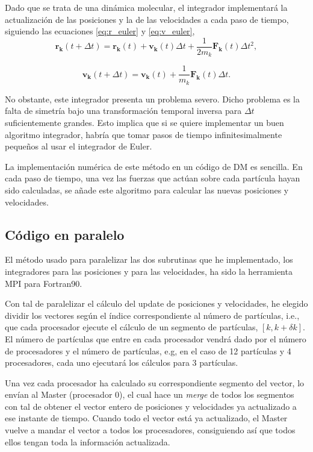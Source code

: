 \documentclass[onecolumn]{article}
\renewcommand{\vec}[1]{\mathbf{#1}}
\begin{document}
Dado que se trata de una dinámica molecular, el integrador implementará la actualización de las posiciones y la de las velocidades
a cada paso de tiempo, siguiendo las ecuaciones \eqref{eq:r_euler} y \eqref{eq:v_euler},
\begin{equation}\label{eq:r_euler} 
\vec{r_k}(t+\Delta t) = \vec{r_k}(t) + \vec{v_k}(t)\Delta t + \frac{1}{2m_k}\vec{F_k}(t)\Delta t^2 ,
\end{equation}

\begin{equation}\label{eq:v_euler} 
\vec{v_k}(t+\Delta t) = \vec{v_k}(t) + \frac{1}{m_k}\vec{F_k}(t)\Delta t .
\end{equation}

No obstante, este integrador presenta un problema severo. Dicho problema es la falta de simetría bajo una transformación temporal inversa para $\Delta t$ 
suficientemente grandes. Esto implica que si se quiere implementar un buen algoritmo integrador, habría que tomar pasos de tiempo infinitesimalmente pequeños
al usar el integrador de Euler.

La implementación numérica de este método en un código de DM es sencilla. En cada paso de tiempo, una vez las fuerzas que actúan sobre cada partícula hayan sido
calculadas, se añade este algoritmo para calcular las nuevas posiciones y velocidades.

\subsection{Código en paralelo}
 
 El método usado para paralelizar las dos subrutinas que he implementado, los integradores para las posiciones y para las velocidades, ha sido la herramienta MPI para
 Fortran90.
 
 Con tal de paralelizar el cálculo del update de posiciones y velocidades, he elegido dividir los vectores según el índice correspondiente al número de partículas, i.e.,
 que cada procesador ejecute el cálculo de un segmento de partículas, $[k , k + \delta k]$. El número de partículas que entre en cada procesador vendrá dado por el número
 de procesadores y el número de partículas, e.g, en el caso de 12 partículas y 4 procesadores, cada uno ejecutará los cálculos para 3 partículas.
 
 Una vez cada procesador ha calculado su correspondiente segmento del vector, lo envían al Master (procesador 0), el cual hace un \textit{merge} de todos los segmentos
 con tal de obtener el vector entero de posiciones y velocidades ya actualizado a ese instante de tiempo. Cuando todo el vector está ya actualizado, el Master vuelve a mandar
 el vector a todos los procesadores, consiguiendo así que todos ellos tengan toda la información actualizada.
 
\end{document}
